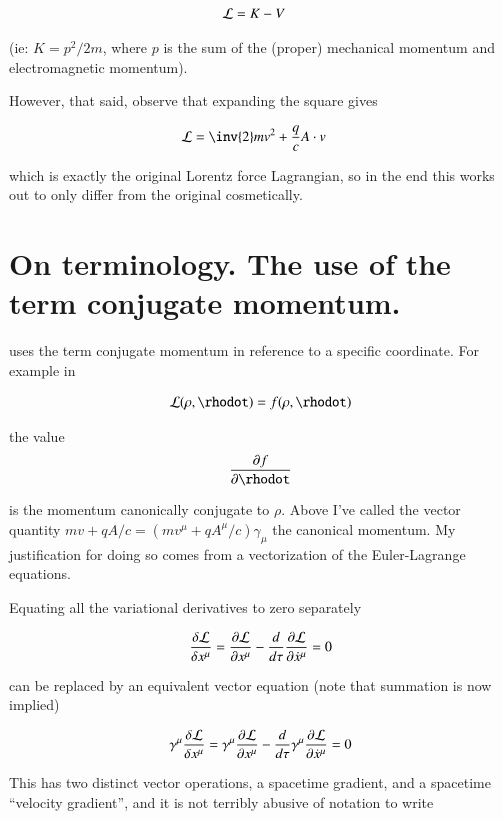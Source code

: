 \begin{align*}
\mathcal{L} &= K - V
\end{align*}

(ie: $K = p^2/2m$, where $p$ is the sum of the (proper) mechanical momentum and electromagnetic momentum).

However, that said, observe that expanding the square gives

\begin{align*}
\LL &= \inv{2} m v^2 + \frac{q}{c} A \cdot v 
\end{align*}

which is exactly the original Lorentz force Lagrangian, so in the end this works out to only differ from the original cosmetically.

\section{On terminology.  The use of the term conjugate momentum. }

\cite{goldstein1951cm} uses the term conjugate momentum in reference to a specific coordinate.  For example in

\begin{align*}
\LL(\rho, \rhodot) = f(\rho, \rhodot)
\end{align*}

the value
\begin{align*}
\PD{\rhodot}{f}
\end{align*}

is the momentum canonically conjugate to $\rho$.  Above I've called the vector quantity $m v + q A/c = (m v^\mu + q A^\mu/c) \gamma_\mu$ the canonical momentum.  My justification for doing so comes from a vectorization of the Euler-Lagrange equations.

Equating all the variational derivatives to zero separately

\begin{align*}
\frac{\delta \mathcal{L}}{\delta x^\mu} = \frac{\partial {\mathcal{L}}}{\partial {x^\mu}} - \frac{d}{d\tau} \frac{\partial {\mathcal{L}}}{\partial {\dot{x}^\mu}} = 0
\end{align*}

can be replaced by an equivalent vector equation (note that summation is now implied)

\begin{align*}
\gamma^\mu \frac{\delta \mathcal{L}}{\delta x^\mu} = \gamma^\mu \frac{\partial {\mathcal{L}}}{\partial {x^\mu}} - \frac{d}{d\tau} \gamma^\mu \frac{\partial {\mathcal{L}}}{\partial {\dot{x}^\mu}} = 0
\end{align*}

This has two distinct vector operations, a spacetime gradient, and a spacetime ``velocity gradient'', and it is not terribly abusive
of notation to write

